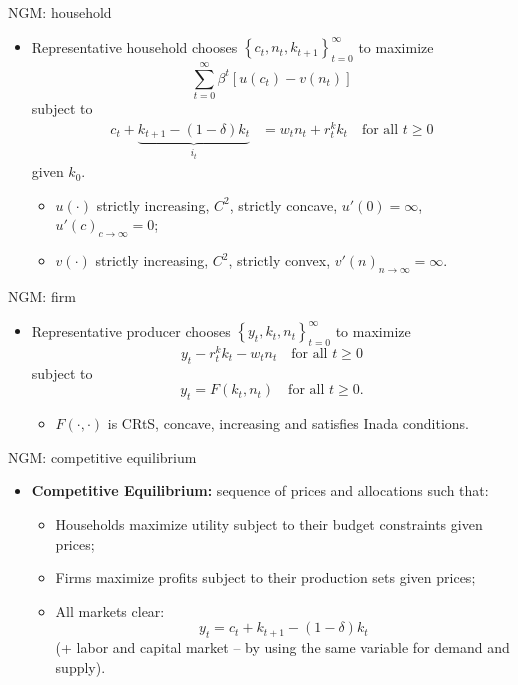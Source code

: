 \documentclass[11pt,xcolor={dvipsnames},aspectratio=159,hyperref={pdftex,pdfpagemode=UseNone,hidelinks,pdfdisplaydoctitle=true},usepdftitle=false]{beamer}
\begin{document}
\begin{frame}{NGM: household}

\begin{itemize} 
    
    \item Representative household chooses $\left\{ c_{t},n_{t},k_{t+1}\right\} _{t=0}^{\infty}$
    to maximize 
    \[
    \sum_{t=0}^{\infty}\beta^{t}\left[u\left(c_{t}\right)-v\left(n_{t}\right)\right]
    \]
     subject to
    \begin{align*}
    c_{t}+\underbrace{k_{t+1}-\left(1-\delta\right)k_{t}}_{i_{t}} & =w_{t}n_{t}+r_{t}^{k}k_{t}\quad\text{for all }t\geq0
    \end{align*}
    given $k_{0}$.
    
    \begin{itemize}
    \item $u\left(\cdot\right)$ strictly increasing, $C^{2}$, strictly concave,
    $u'\left(0\right)=\infty$, $u'\left(c\right)_{c\rightarrow\infty}=0$;
    \item $v\left(\cdot\right)$ strictly increasing, $C^{2}$, strictly convex,
    $v'\left(n\right)_{n\rightarrow\infty}=\infty$.
    \end{itemize}
\end{itemize}    
\end{frame}


\begin{frame}{NGM: firm}

    \begin{itemize} 
        \item Representative producer chooses $\left\{ y_{t},k_{t},n_{t}\right\} _{t=0}^{\infty}$
    to maximize 
    \[
    y_{t}-r_{t}^{k}k_{t}-w_{t}n_{t}\quad\text{for all }t\geq0
    \]
    subject to 
    \[
    y_{t}=F\left(k_{t},n_{t}\right)\quad\text{for all }t\geq0.
    \]
    \begin{itemize}
    \item $F\left(\cdot,\cdot\right)$ is CRtS, concave, increasing
    and satisfies Inada conditions.
    \end{itemize} 
\end{itemize}
    \end{frame}

\begin{frame}{NGM: competitive equilibrium}

       \begin{itemize}
        \item \textbf{Competitive Equilibrium: }sequence of prices and allocations
such that:
\begin{itemize}
\item Households maximize utility subject to their budget constraints given
prices;
\item Firms maximize profits subject to their production sets given prices;
\item All markets clear: 
        $$y_{t}=c_{t}+k_{t+1}-\left(1-\delta\right)k_{t}$$
        (+ labor and capital market -- by using the same variable for
        demand and supply).
\end{itemize}
\end{itemize}
        \end{frame}
\end{document}
